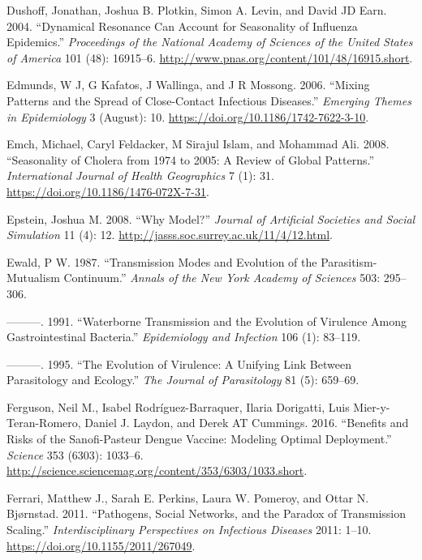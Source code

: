 \documentclass[
]{book}
\begin{document}
\leavevmode\hypertarget{ref-dushoff04}{}%
Dushoff, Jonathan, Joshua B. Plotkin, Simon A. Levin, and David JD Earn. 2004. ``Dynamical Resonance Can Account for Seasonality of Influenza Epidemics.'' \emph{Proceedings of the National Academy of Sciences of the United States of America} 101 (48): 16915--6. \url{http://www.pnas.org/content/101/48/16915.short}.

\leavevmode\hypertarget{ref-edmunds06}{}%
Edmunds, W J, G Kafatos, J Wallinga, and J R Mossong. 2006. ``Mixing Patterns and the Spread of Close-Contact Infectious Diseases.'' \emph{Emerging Themes in Epidemiology} 3 (August): 10. \url{https://doi.org/10.1186/1742-7622-3-10}.

\leavevmode\hypertarget{ref-emch08}{}%
Emch, Michael, Caryl Feldacker, M Sirajul Islam, and Mohammad Ali. 2008. ``Seasonality of Cholera from 1974 to 2005: A Review of Global Patterns.'' \emph{International Journal of Health Geographics} 7 (1): 31. \url{https://doi.org/10.1186/1476-072X-7-31}.

\leavevmode\hypertarget{ref-epstein08}{}%
Epstein, Joshua M. 2008. ``Why Model?'' \emph{Journal of Artificial Societies and Social Simulation} 11 (4): 12. \url{http://jasss.soc.surrey.ac.uk/11/4/12.html}.

\leavevmode\hypertarget{ref-ewald87}{}%
Ewald, P W. 1987. ``Transmission Modes and Evolution of the Parasitism-Mutualism Continuum.'' \emph{Annals of the New York Academy of Sciences} 503: 295--306.

\leavevmode\hypertarget{ref-ewald91}{}%
---------. 1991. ``Waterborne Transmission and the Evolution of Virulence Among Gastrointestinal Bacteria.'' \emph{Epidemiology and Infection} 106 (1): 83--119.

\leavevmode\hypertarget{ref-ewald95}{}%
---------. 1995. ``The Evolution of Virulence: A Unifying Link Between Parasitology and Ecology.'' \emph{The Journal of Parasitology} 81 (5): 659--69.

\leavevmode\hypertarget{ref-ferguson16}{}%
Ferguson, Neil M., Isabel Rodríguez-Barraquer, Ilaria Dorigatti, Luis Mier-y-Teran-Romero, Daniel J. Laydon, and Derek AT Cummings. 2016. ``Benefits and Risks of the Sanofi-Pasteur Dengue Vaccine: Modeling Optimal Deployment.'' \emph{Science} 353 (6303): 1033--6. \url{http://science.sciencemag.org/content/353/6303/1033.short}.

\leavevmode\hypertarget{ref-ferrari11}{}%
Ferrari, Matthew J., Sarah E. Perkins, Laura W. Pomeroy, and Ottar N. Bjørnstad. 2011. ``Pathogens, Social Networks, and the Paradox of Transmission Scaling.'' \emph{Interdisciplinary Perspectives on Infectious Diseases} 2011: 1--10. \url{https://doi.org/10.1155/2011/267049}.
\end{document}
